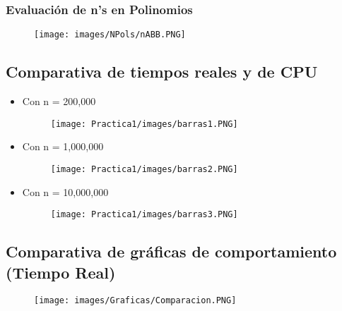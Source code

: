 \documentclass[12pt]{article}
\begin{document}
            \subsubsection{Evaluación de n's en Polinomios}
                        \begin{figure}[H]
        	            \centering
        	             \texttt{[image: images/NPols/nABB.PNG]}
                \end{figure}
            
\clearpage
        
		\subsection{Comparativa de tiempos reales y de CPU}
		\begin{itemize}
		    \item Con n = 200,000
		    \begin{figure}[h!]
                \centering
               \texttt{[image: Practica1/images/barras1.PNG]}
            \end{figure}
		    \item Con n = 1,000,000
		    \begin{figure}[h!]
                
               \texttt{[image: Practica1/images/barras2.PNG]}
            \end{figure}
		    \item Con n = 10,000,000
		    \begin{figure}[h!]
                
               \texttt{[image: Practica1/images/barras3.PNG]}
            \end{figure}
		\end{itemize}
		
		
		\subsection{Comparativa de gráficas de comportamiento (Tiempo Real)}
		  \begin{figure}[H]
    	            \centering
    	            \texttt{[image: images/Graficas/Comparacion.PNG]}
            \end{figure}
		\newpage
\end{document}
